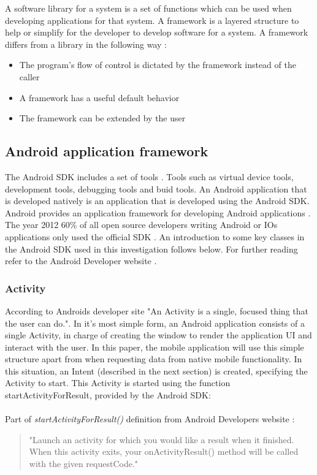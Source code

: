 A software library for a system is a set of functions which can be used when developing applications for that system. A framework is a layered structure to help or simplify for the developer to develop software for a system. A framework differs from a library in the following way \cite{riehle2000}:

\begin{itemize}
\item The program's flow of control is dictated by the framework instead of the caller
\item A framework has a useful default behavior
\item The framework can be extended by the user
\end{itemize}

\subsection{Android application framework} \label{subsec:android-application-framework}
The Android SDK includes a set of tools \cite{sdk2015}. Tools such as virtual device tools, development tools, debugging tools and buid tools. An Android application that is developed natively is an application that is developed using the Android SDK. Android provides an application framework for developing Android applications \cite{android-framework2015}. The year 2012 60\% of all open source developers writing Android or IOs applications only used the official SDK \cite{eclipse2012}. An introduction to some key classes in the Android SDK used in this investigation follows below. For further reading refer to the Android Developer website \cite{androiddevelopers2015}.

\subsubsection{Activity}\label{subsubsec:activity}
According to Androids developer site \cite{activity2015} "An Activity is a single, focused thing that the user can do.". In it's most simple form, an Android application consists of a single Activity, in charge of creating the window to render the application UI and interact with the user. In this paper, the mobile application will use this simple structure apart from when requesting data from native mobile functionality. In this situation, an Intent (described in the next section) is created, specifying the Activity to start. This Activity is started using the function startActivityForResult, provided by the Android SDK:
\\\\
Part of \emph{startActivityForResult()} definition from Android Developers website \cite{androiddevelopers2015}:\\
\begin{quotation}
"Launch an activity for which you would like a result when it finished. When this activity exits, your onActivityResult() method will be called with the given requestCode."
\end{quotation}

